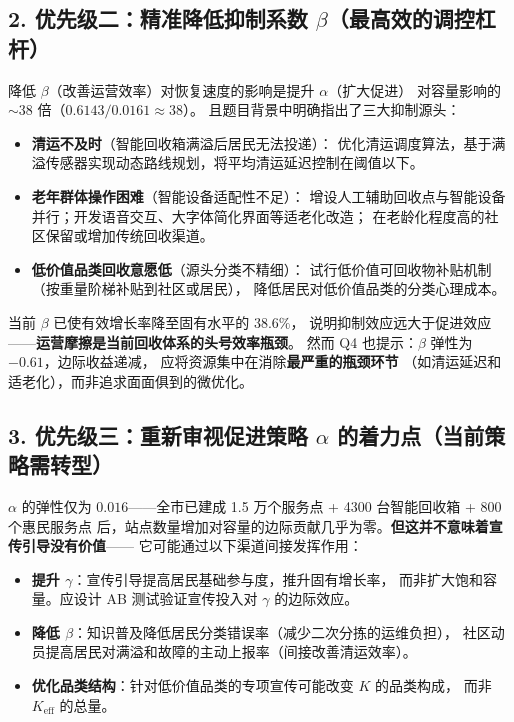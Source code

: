 \documentclass[12pt,a4paper]{article}
\begin{document}
\subsection*{2. 优先级二：精准降低抑制系数 $\beta$（最高效的调控杠杆）}

降低 $\beta$（改善运营效率）对恢复速度的影响是提升 $\alpha$（扩大促进）
对容量影响的 $\sim 38$ 倍（$0.6143 / 0.0161 \approx 38$）。
且题目背景中明确指出了三大抑制源头：

\begin{itemize}
  \item \textbf{清运不及时}（智能回收箱满溢后居民无法投递）：
        优化清运调度算法，基于满溢传感器实现动态路线规划，将平均清运延迟控制在阈值以下。
  \item \textbf{老年群体操作困难}（智能设备适配性不足）：
        增设人工辅助回收点与智能设备并行；开发语音交互、大字体简化界面等适老化改造；
        在老龄化程度高的社区保留或增加传统回收渠道。
  \item \textbf{低价值品类回收意愿低}（源头分类不精细）：
        试行低价值可回收物补贴机制（按重量阶梯补贴到社区或居民），
        降低居民对低价值品类的分类心理成本。
\end{itemize}

当前 $\beta$ 已使有效增长率降至固有水平的 $38.6\%$，
说明抑制效应远大于促进效应——\textbf{运营摩擦是当前回收体系的头号效率瓶颈}。
然而 Q4 也提示：$\beta$ 弹性为 $-0.61$，边际收益递减，
应将资源集中在消除\textbf{最严重的瓶颈环节}
（如清运延迟和适老化），而非追求面面俱到的微优化。

\subsection*{3. 优先级三：重新审视促进策略 $\alpha$ 的着力点（当前策略需转型）}

$\alpha$ 的弹性仅为 $0.016$——全市已建成 1.5 万个服务点 + 4300 台智能回收箱 + 800 个惠民服务点
后，站点数量增加对容量的边际贡献几乎为零。\textbf{但这并不意味着宣传引导没有价值}——
它可能通过以下渠道间接发挥作用：

\begin{itemize}
  \item \textbf{提升 $\gamma$}：宣传引导提高居民基础参与度，推升固有增长率，
        而非扩大饱和容量。应设计 AB 测试验证宣传投入对 $\gamma$ 的边际效应。
  \item \textbf{降低 $\beta$}：知识普及降低居民分类错误率（减少二次分拣的运维负担），
        社区动员提高居民对满溢和故障的主动上报率（间接改善清运效率）。
  \item \textbf{优化品类结构}：针对低价值品类的专项宣传可能改变 $K$ 的品类构成，
        而非 $K_{\text{eff}}$ 的总量。
\end{itemize}
\end{document}
